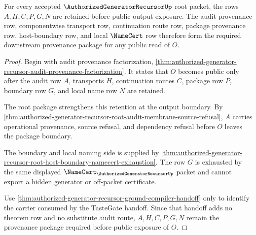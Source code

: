 \begin{theorem}
\label{thm:authorized-generator-recursor-audit-provenance-row}
For every accepted $\AuthorizedGeneratorRecursorUp$ root packet, the rows $A,H,C,P,G,N$ are retained before public output exposure. The audit provenance row, componentwise transport row, continuation route row, package provenance row, host-boundary row, and local $\NameCert$ row therefore form the required downstream provenance package for any public read of $O$.
\end{theorem}
\begin{proof}
Begin with audit provenance factorization, \autoref{thm:authorized-generator-recursor-audit-provenance-factorization}. It states that $O$ becomes public only after the audit row $A$, transports $H$, continuation routes $C$, package row $P$, boundary row $G$, and local name row $N$ are retained.

The root package strengthens this retention at the output boundary. By \autoref{thm:authorized-generator-recursor-root-audit-membrane-source-refusal}, $A$ carries operational provenance, source refusal, and dependency refusal before $O$ leaves the package boundary.

The boundary and local naming side is supplied by \autoref{thm:authorized-generator-recursor-root-host-boundary-namecert-exhaustion}. The row $G$ is exhausted by the same displayed $\NameCert_{\AuthorizedGeneratorRecursorUp}$ packet and cannot export a hidden generator or off-packet certificate.

Use \autoref{thm:authorized-generator-recursor-ground-compiler-handoff} only to identify the carrier consumed by the TasteGate handoff. Since that handoff adds no theorem row and no substitute audit route, $A,H,C,P,G,N$ remain the provenance package required before public exposure of $O$.
\end{proof}

